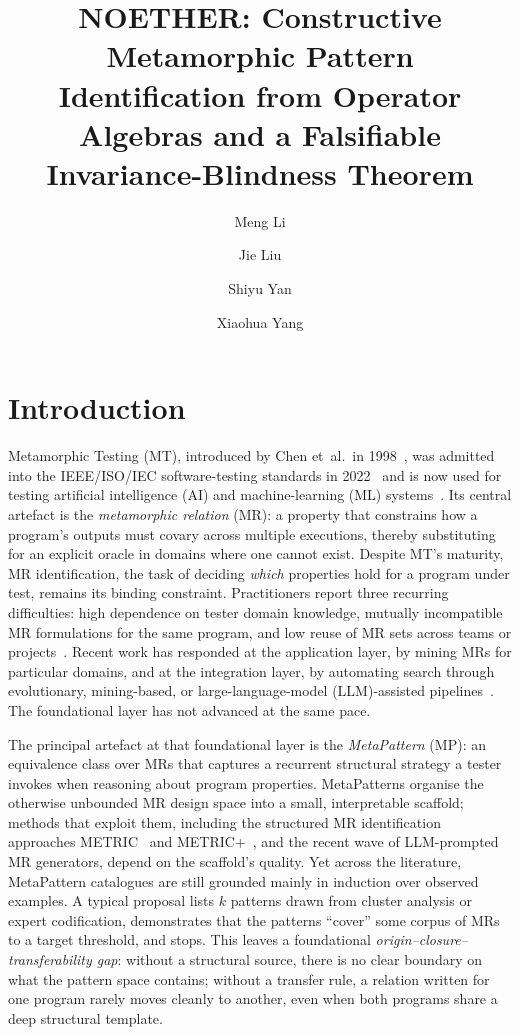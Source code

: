 \documentclass[manuscript]{acmart}
\title{NOETHER: Constructive Metamorphic Pattern Identification from Operator Algebras and a Falsifiable Invariance-Blindness Theorem}
\affiliation{%
    \institution{School of Computing, University of South China}
    \city{Hengyang}
    \postcode{421001}
    \country{China}
  }%
\affiliation{%
    \institution{Hunan Engineering Research Center of Software Evaluation and Testing for Intellectual Equipment}
    \city{Hengyang}
    \postcode{421001}
    \country{China}
  }%
\affiliation{%
    \institution{CNNC Key Laboratory on High Trusted Computing}
    \city{Hengyang}
    \postcode{421001}
    \country{China}
  }%
\author{Meng Li}
\author{Jie Liu}
\author{Shiyu Yan}
\author{Xiaohua Yang}
\begin{document}
\maketitle

\section{Introduction}
\label{sec:intro}

Metamorphic Testing (MT), introduced by Chen et~al.\ in 1998~\cite{Chen1998}, was admitted into the IEEE/ISO/IEC software-testing standards in 2022~\cite{ISO29119} and is now used for testing artificial intelligence (AI) and machine-learning (ML) systems~\cite{Segura2016, LiTOSEM2025}. Its central artefact is the \emph{metamorphic relation} (MR): a property that constrains how a program's outputs must covary across multiple executions, thereby substituting for an explicit oracle in domains where one cannot exist. Despite MT's maturity, MR identification, the task of deciding \emph{which} properties hold for a program under test, remains its binding constraint. Practitioners report three recurring difficulties: high dependence on tester domain knowledge, mutually incompatible MR formulations for the same program, and low reuse of MR sets across teams or projects~\cite{Segura2016, LiTOSEM2025}. Recent work has responded at the application layer, by mining MRs for particular domains, and at the integration layer, by automating search through evolutionary, mining-based, or large-language-model (LLM)-assisted pipelines~\cite{MRScout2024, GenMorph2024, Shin2024}. The foundational layer has not advanced at the same pace.

The principal artefact at that foundational layer is the \emph{MetaPattern} (MP): an equivalence class over MRs that captures a recurrent structural strategy a tester invokes when reasoning about program properties. MetaPatterns organise the otherwise unbounded MR design space into a small, interpretable scaffold; methods that exploit them, including the structured MR identification approaches METRIC~\cite{ChenMETRIC2016} and METRIC+~\cite{SunMETRICplus2021}, and the recent wave of LLM-prompted MR generators, depend on the scaffold's quality. Yet across the literature, MetaPattern catalogues are still grounded mainly in induction over observed examples. A typical proposal lists $k$ patterns drawn from cluster analysis or expert codification, demonstrates that the patterns ``cover'' some corpus of MRs to a target threshold, and stops. This leaves a foundational \emph{origin--closure--transferability gap}: without a structural source, there is no clear boundary on what the pattern space contains; without a transfer rule, a relation written for one program rarely moves cleanly to another, even when both programs share a deep structural template.
\end{document}

